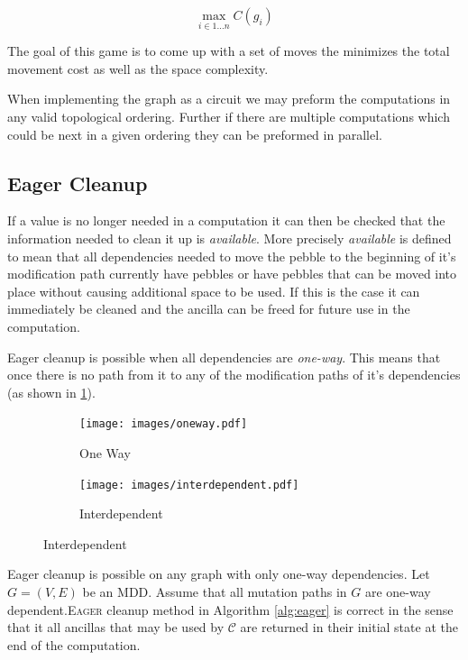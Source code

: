 \[ \max_{i\in 1 \dotsc n} C(g_i) \]

The goal of this game is to come up with a set of moves the minimizes the total
movement cost as well as the space complexity.

When implementing the graph as a circuit we may preform the computations in any
valid topological ordering. Further if there are multiple computations which
could be next in a given ordering they can be preformed in parallel.

\subsection{Eager Cleanup}

If a value is no longer needed in a computation it can then be checked that the
information needed to clean it up is \emph{available}.  More precisely
\emph{available} is defined to mean that all dependencies needed to move the
pebble to the beginning of it's modification path currently have pebbles or have
pebbles that can be moved into place without causing additional space to be
used. If this is the case it can immediately be cleaned and the ancilla can be freed for
future use in the computation.

Eager cleanup is possible when all dependencies are \emph{one-way}.
This means that once there is no path from it to any of the modification paths
of it's dependencies (as shown in \cref{fig:one-way}).

\begin{figure}
  \centering
  \begin{subfigure}[b]{0.3\textwidth}
    \texttt{[image: images/oneway.pdf]}
    \caption{One Way}
    \label{fig:one-way}
  \end{subfigure}
  \qquad
  \begin{subfigure}[b]{0.3\textwidth}
    \texttt{[image: images/interdependent.pdf]}
    \caption{Interdependent}
    \label{fig:interdep}
  \end{subfigure}
\end{figure}


\begin{theorem}

Eager cleanup is possible on any graph with only one-way dependencies.  Let
$G=(V,E)$ be an MDD.  Assume that all mutation paths in $G$ are one-way
dependent.\textsc{Eager} cleanup method in Algorithm
\ref{alg:eager} is correct in the sense that it all ancillas that may be used by
${\mathcal C}$ are returned in their initial state at the end of the
computation.

\end{theorem}

